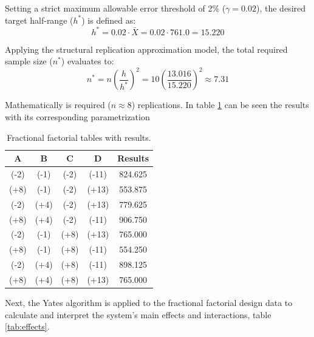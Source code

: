 \documentclass[12pt,a4paper]{article}
\begin{document}
	\noindent Setting a strict maximum allowable error threshold of 2\% ($\gamma = 0.02$), the desired target half-range ($h^*$) is defined as:
	\begin{equation}
		h^* = 0.02 \cdot \bar{X} = 0.02 \cdot 761.0 = 15.220
	\end{equation}
	
	\noindent Applying the structural replication approximation model, the total required sample size ($n^*$) evaluates to:
	\begin{equation}
		n^* = n \left( \frac{h}{h^*} \right)^2 = 10 \left( \frac{13.016}{15.220} \right)^2 \approx 7.31
	\end{equation}
	
	\noindent Mathematically is required ($n \approx 8$) replications. In table \ref{tab:factorial_combinations} can be seen the results with its corresponding parametrization
	
	\begin{table}[htbp]
		\centering
		\begin{tabular}{cccc|c}
			\toprule
			\textbf{A} & \textbf{B} & \textbf{C} & \textbf{D} & \textbf{Results} \\
			\midrule
			(-2) & (-1) & (-2) & (-11) & 824.625 \\
			(+8) & (-1) & (-2) & (+13) & 553.875 \\
			(-2) & (+4) & (-2) & (+13) & 779.625 \\
			(+8) & (+4) & (-2) & (-11) & 906.750 \\
			(-2) & (-1) & (+8) & (+13) & 765.000 \\
			(+8) & (-1) & (+8) & (-11) & 554.250 \\
			(-2) & (+4) & (+8) & (-11) & 898.125 \\
			(+8) & (+4) & (+8) & (+13) & 765.000 \\
			\bottomrule
		\end{tabular}
		\caption{Fractional factorial tables with results.}
		\label{tab:factorial_combinations}
	\end{table}
	\FloatBarrier
	
	\noindent Next, the Yates algorithm is applied to the fractional factorial design data to calculate and interpret the system's main effects and interactions, table \ref{tab:effects}.
	
\end{document}
